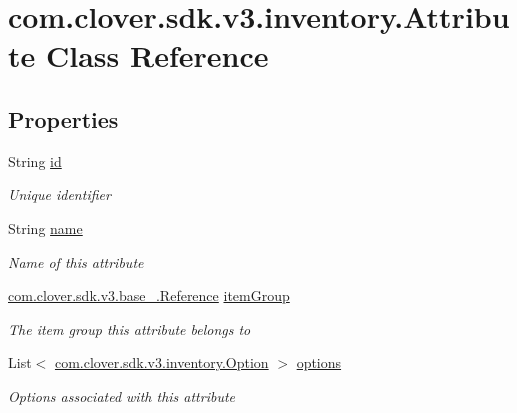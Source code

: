 \hypertarget{classcom_1_1clover_1_1sdk_1_1v3_1_1inventory_1_1_attribute}{}\section{com.\+clover.\+sdk.\+v3.\+inventory.\+Attribute Class Reference}
\label{classcom_1_1clover_1_1sdk_1_1v3_1_1inventory_1_1_attribute}
\subsection*{Properties}
\begin{DoxyCompactItemize}
\item 
String \hyperlink{classcom_1_1clover_1_1sdk_1_1v3_1_1inventory_1_1_attribute_a94cffcd8c13ea10076ce6d0835f2ae8e}{id}
\begin{DoxyCompactList}\small\item\em Unique identifier \end{DoxyCompactList}\item 
String \hyperlink{classcom_1_1clover_1_1sdk_1_1v3_1_1inventory_1_1_attribute_ae5418007d896bd23042093e67cc1c2d9}{name}
\begin{DoxyCompactList}\small\item\em Name of this attribute \end{DoxyCompactList}\item 
\hyperlink{classcom_1_1clover_1_1sdk_1_1v3_1_1base___1_1_reference}{com.\+clover.\+sdk.\+v3.\+base\+\_\+.\+Reference} \hyperlink{classcom_1_1clover_1_1sdk_1_1v3_1_1inventory_1_1_attribute_a1732de82dbe06147ca4a80a8847074ee}{item\+Group}
\begin{DoxyCompactList}\small\item\em The item group this attribute belongs to \end{DoxyCompactList}\item 
List$<$ \hyperlink{classcom_1_1clover_1_1sdk_1_1v3_1_1inventory_1_1_option}{com.\+clover.\+sdk.\+v3.\+inventory.\+Option} $>$ \hyperlink{classcom_1_1clover_1_1sdk_1_1v3_1_1inventory_1_1_attribute_a1d428824d832818f79da2c6695c732a2}{options}
\begin{DoxyCompactList}\small\item\em Options associated with this attribute \end{DoxyCompactList}\end{DoxyCompactItemize}


